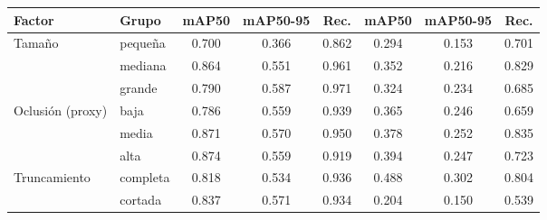 \begin{tabular}{llcccccc}
\hline
Factor & Grupo & mAP50 & mAP50-95 & Rec. & mAP50 & mAP50-95 & Rec. \\
\hline
Tama\~no & peque\~na & 0.700 & 0.366 & 0.862 & 0.294 & 0.153 & 0.701 \\
 & mediana & 0.864 & 0.551 & 0.961 & 0.352 & 0.216 & 0.829 \\
 & grande & 0.790 & 0.587 & 0.971 & 0.324 & 0.234 & 0.685 \\
Oclusi\'on (proxy) & baja & 0.786 & 0.559 & 0.939 & 0.365 & 0.246 & 0.659 \\
 & media & 0.871 & 0.570 & 0.950 & 0.378 & 0.252 & 0.835 \\
 & alta & 0.874 & 0.559 & 0.919 & 0.394 & 0.247 & 0.723 \\
Truncamiento & completa & 0.818 & 0.534 & 0.936 & 0.488 & 0.302 & 0.804 \\
 & cortada & 0.837 & 0.571 & 0.934 & 0.204 & 0.150 & 0.539 \\
\hline
\end{tabular}
